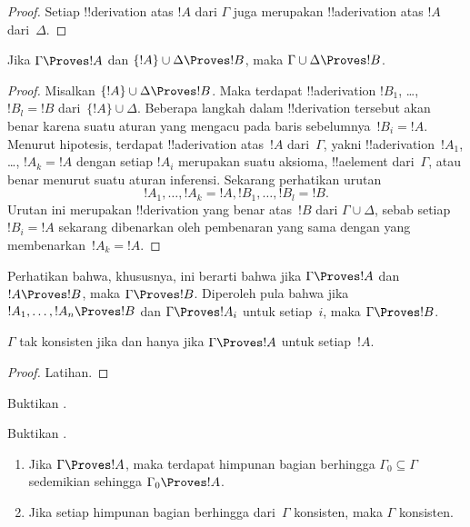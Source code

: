 \documentclass[../../../include/open-logic-section]{subfiles}
\begin{document}
\begin{proof}
Setiap !!{derivation} atas $!A$ dari $\Gamma$ juga merupakan
!!a{derivation} atas $!A$ dari~$\Delta$.
\end{proof}

\begin{prop}[Transitivitas]
Jika $\Gamma \Proves !A$ dan $\{!A\} \cup \Delta \Proves
!B$, maka $\Gamma \cup \Delta \Proves !B$.
\end{prop}

\begin{proof}
  Misalkan $\{!A\} \cup \Delta \Proves !B$. Maka terdapat
  !!a{derivation} $!B_1$, \dots, $!B_l = !B$ dari~$\{!A\} \cup
  \Delta$. Beberapa langkah dalam !!{derivation} tersebut akan benar
  karena suatu aturan yang mengacu pada baris sebelumnya~$!B_i = !A$.
  Menurut hipotesis, terdapat !!a{derivation} atas~$!A$ dari~$\Gamma$,
  yakni !!a{derivation}~$!A_1$, \dots, $!A_k = !A$ dengan setiap
  $!A_i$ merupakan suatu aksioma, !!a{element} dari~$\Gamma$, atau
  benar menurut suatu aturan inferensi. Sekarang perhatikan urutan
  \[
  !A_1, \dots, !A_k = !A, !B_1, \dots, !B_l = !B.
  \]
  Urutan ini merupakan !!{derivation} yang benar atas~$!B$ dari
  $\Gamma \cup \Delta$, sebab setiap $!B_i = !A$ sekarang dibenarkan
  oleh pembenaran yang sama dengan yang membenarkan~$!A_k = !A$.
\end{proof}

Perhatikan bahwa, khususnya, ini berarti bahwa jika $\Gamma \Proves !A$
dan $!A \Proves !B$, maka $\Gamma \Proves !B$. Diperoleh pula bahwa
jika $!A_1, \dots, !A_n \Proves !B$ dan $\Gamma \Proves !A_i$ untuk
setiap~$i$, maka $\Gamma \Proves !B$.

\begin{prop}
$\Gamma$ tak konsisten jika dan hanya jika $\Gamma \Proves !A$ untuk
setiap~$!A$.
\end{prop}

\begin{proof}
Latihan.
\end{proof}

\begin{prob}
Buktikan .
\end{prob}
\tagendprob

\begin{prob}
Buktikan .
\end{prob}
\tagendprob

\begin{prop}[Kekompakan]
  \begin{enumerate}
  \item Jika $\Gamma \Proves !A$, maka terdapat himpunan bagian berhingga
    $\Gamma_0 \subseteq \Gamma$ sedemikian sehingga
    $\Gamma_0 \Proves !A$.
  \item Jika setiap himpunan bagian berhingga dari~$\Gamma$ konsisten,
    maka $\Gamma$ konsisten.
  \end{enumerate}
\end{prop}
\end{document}
